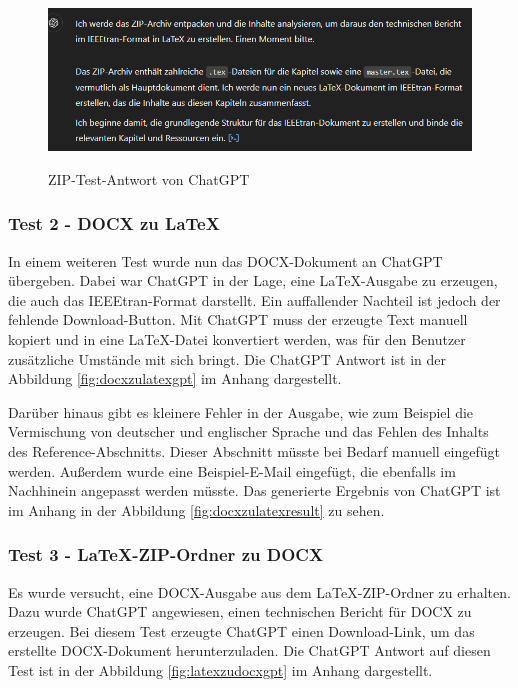 \begin{figure}[H]
\centering
\includegraphics[width=0.9\linewidth]{Images/Zip-test-antwort.png}\\
\caption{ZIP-Test-Antwort von Chat\ac{GPT}}
\label{fig:Zip_test_antwort}
\end{figure}

\subsubsection{Test 2 - DOCX zu LaTeX}

In einem weiteren Test wurde nun das \ac{DOCX}-Dokument an Chat\ac{GPT} übergeben. Dabei war Chat\ac{GPT} in der Lage, eine LaTeX-Ausgabe zu erzeugen, die auch das IEEEtran-Format darstellt. Ein auffallender Nachteil ist jedoch der fehlende Download-Button. Mit Chat\ac{GPT} muss der erzeugte Text manuell kopiert und in eine LaTeX-Datei konvertiert werden, was für den Benutzer zusätzliche Umstände mit sich bringt. Die Chat\ac{GPT} Antwort ist in der Abbildung \ref{fig:docxzulatexgpt} im Anhang dargestellt.

Darüber hinaus gibt es kleinere Fehler in der Ausgabe, wie zum Beispiel die Vermischung von deutscher und englischer Sprache und das Fehlen des Inhalts des Reference-Abschnitts. Dieser Abschnitt müsste bei Bedarf manuell eingefügt werden. Außerdem wurde eine Beispiel-E-Mail eingefügt, die ebenfalls im Nachhinein angepasst werden müsste. Das generierte Ergebnis von Chat\ac{GPT} ist im Anhang in der Abbildung \ref{fig:docxzulatexresult} zu sehen.


\subsubsection{Test 3 - LaTeX-ZIP-Ordner zu \ac{DOCX}}

Es wurde versucht, eine \ac{DOCX}-Ausgabe aus dem LaTeX-ZIP-Ordner zu erhalten. Dazu wurde Chat\ac{GPT} angewiesen, einen technischen Bericht für \ac{DOCX} zu erzeugen. Bei diesem Test erzeugte Chat\ac{GPT} einen Download-Link, um das erstellte \ac{DOCX}-Dokument herunterzuladen. Die Chat\ac{GPT} Antwort auf diesen Test ist in der Abbildung \ref{fig:latexzudocxgpt} im Anhang dargestellt.  

